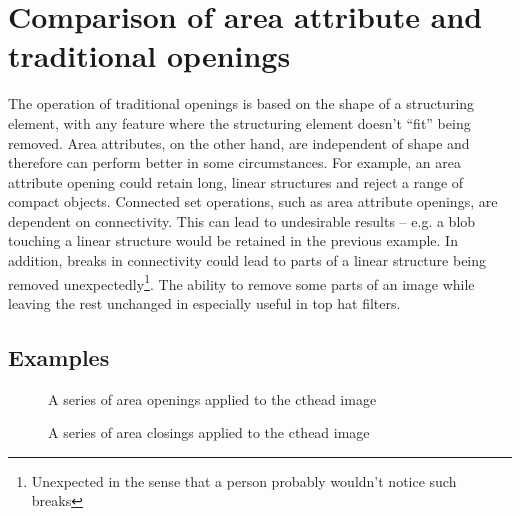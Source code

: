 \documentclass{InsightArticle}
\begin{document}
\section{Comparison of area attribute and traditional openings}
The operation of traditional openings is based on the shape of a
structuring element, with any feature where the structuring element
doesn't ``fit'' being removed. Area attributes, on the other hand, are
independent of shape and therefore can perform better in some
circumstances. For example, an area attribute opening could retain
long, linear structures and reject a range of compact
objects. Connected set operations, such as area attribute openings,
are dependent on connectivity. This can lead to undesirable results --
e.g. a blob touching a linear structure would be retained in the
previous example. In addition, breaks in connectivity could lead to
parts of a linear structure being removed
unexpectedly\footnote{Unexpected in the sense that a person probably
wouldn't notice such breaks}. The ability to remove some parts of an
image while leaving the rest unchanged in especially useful in top hat
filters.

\subsection{Examples}
\begin{figure}[htbp]
\begin{center}
\caption{A series of area openings applied to the cthead image\label{fig:ctheadopening}}
\end{center}
\end{figure}
\begin{figure}[htbp]
\begin{center}
\caption{A series of area closings applied to the cthead image\label{fig:ctheadclosing}}
\end{center}
\end{figure}
\end{document}
